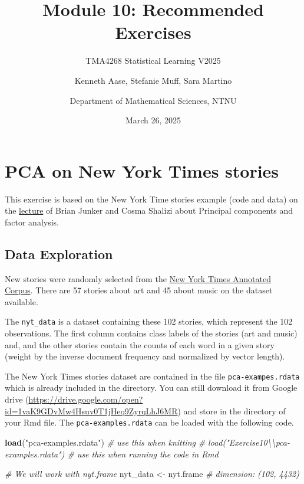 \documentclass[
]{article}
\title{Module 10: Recommended Exercises}
\subtitle{TMA4268 Statistical Learning V2025}
\author{Kenneth Aase, Stefanie Muff, Sara Martino \and Department of
Mathematical Sciences, NTNU}
\date{March 26, 2025}
\newenvironment{Shaded}{\begin{snugshade}}{\end{snugshade}}
\newcommand{\CommentTok}[1]{\textcolor[rgb]{0.56,0.35,0.01}{\textit{#1}}}
\newcommand{\FunctionTok}[1]{\textcolor[rgb]{0.13,0.29,0.53}{\textbf{#1}}}
\newcommand{\NormalTok}[1]{#1}
\newcommand{\OtherTok}[1]{\textcolor[rgb]{0.56,0.35,0.01}{#1}}
\newcommand{\StringTok}[1]{\textcolor[rgb]{0.31,0.60,0.02}{#1}}
\begin{document}
\maketitle

\section{PCA on New York Times
stories}\label{pca-on-new-york-times-stories}

This exercise is based on the New York Time stories example (code and
data) on the \href{http://www.stat.cmu.edu/~cshalizi/490/10/}{lecture}
of Brian Junker and Cosma Shalizi about Principal components and factor
analysis.

\subsection{Data Exploration}\label{data-exploration}

New stories were randomly selected from the
\href{https://catalog.ldc.upenn.edu/LDC2008T19}{New York Times Annotated
Corpus}. There are 57 stories about art and 45 about music on the
dataset available.

The \texttt{nyt\_data} is a dataset containing these 102 stories, which
represent the 102 observations. The first column contains class labels
of the stories (art and music) and, and the other stories contain the
counts of each word in a given story (weight by the inverse document
frequency and normalized by vector length).

The New York Times stories dataset are contained in the file
\texttt{pca-exampes.rdata} which is already included in the directory.
You can still download it from Google drive
(\url{https://drive.google.com/open?id=1vaK9GDvMw4Hsuv0T1jHeq9ZyrqLhJ6MR})
and store in the directory of your Rmd file. The
\texttt{pca-examples.rdata} can be loaded with the following code.

\begin{Shaded}
\begin{Highlighting}[]
\FunctionTok{load}\NormalTok{(}\StringTok{"pca{-}examples.rdata"}\NormalTok{)  }\CommentTok{\# use this when knitting}
\CommentTok{\# load("Exercise10\textbackslash{}\textbackslash{}pca{-}examples.rdata")  \# use this when running the code in Rmd}

\CommentTok{\# We will work with nyt.frame}
\NormalTok{nyt\_data }\OtherTok{\textless{}{-}}\NormalTok{ nyt.frame  }\CommentTok{\# dimension: (102, 4432)}
\end{Highlighting}
\end{Shaded}
\end{document}
